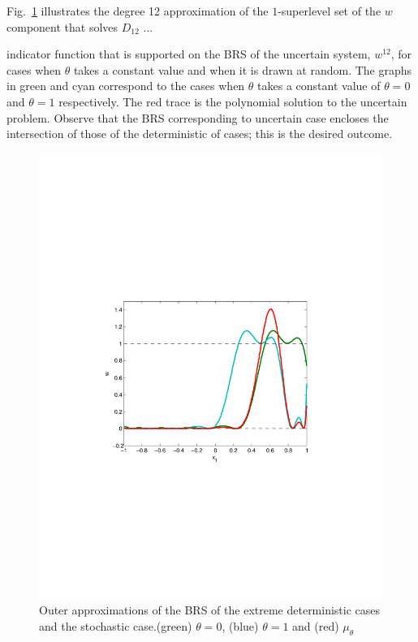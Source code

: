 Fig.~\ref{fig:1D:linear} illustrates the degree 12 approximation of the $1$-superlevel set of the $w$ component that solves $D_{12}$ ...

 indicator function that is supported on the BRS of the uncertain system, $w^{12}$, for cases when $\theta$ takes a constant value and when it is drawn at random. The graphs in green and cyan correspond to the cases when $\theta$ takes a constant value of $\theta=0$ and $\theta=1$ respectively. The red trace is the polynomial solution to the uncertain problem. Observe that the BRS corresponding to uncertain case encloses the intersection of those of the deterministic of cases; this is the desired outcome.
\begin{figure}[!t]
  \includegraphics[width=\columnwidth,trim =1.5in 3.3in 1.5in 3.5in, clip=true]{figures/1D_3}
  \caption{Outer approximations of the BRS of the extreme deterministic cases and the stochastic case.(green) $\theta=0$, (blue) $\theta=1$ and (red) $\mu_\theta$}
    \label{fig:1D:linear}
\end{figure}


